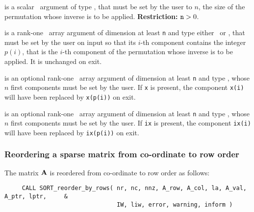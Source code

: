 \documentclass{galahad}
\begin{document}
\begin{description}
 is a scalar \intentin\ argument of type
\integer, that must be set by the user to $n$, the size of the permutation
whose inverse is to be applied.
{\bf Restriction:} ${\tt n} > 0$.

 is a rank-one \intentinout\ array argument of
dimension at least {\tt n} and type either
\integer\ or \realdp, that must be set by the user
on input so that its $i$-th component contains the integer $p(i)$, that is the
$i$-th component of the permutation whose inverse is to be applied.
It is unchanged on exit.

 is an optional rank-one \intentinout\ array argument of
dimension at least {\tt n} and type \realdp, whose $n$ first components must
be set by the user. If {\tt x} is present, the component {\tt x(i)} will have
been replaced by {\tt x(p(i))} on exit.

 is an optional rank-one \intentinout\ array argument of
dimension at least {\tt n} and type \integer, whose $n$ first components must
be set by the user. If {\tt ix} is present, the component {\tt ix(i)} will have
been replaced by {\tt ix(p(i))} on exit.
\end{description}

\subsubsection{Reordering a sparse matrix from co-ordinate to row order}

The matrix ${\mathbf{A}}$ is reordered from co-ordinate to row order as follows:
\hskip0.5in
\def\baselinestretch{1.0} {\tt \begin{verbatim}
     CALL SORT_reorder_by_rows( nr, nc, nnz, A_row, A_col, la, A_val,  A_ptr, lptr,     &
                                IW, liw, error, warning, inform )
\end{verbatim}}
\def\baselinestretch{1.0}
\end{document}
